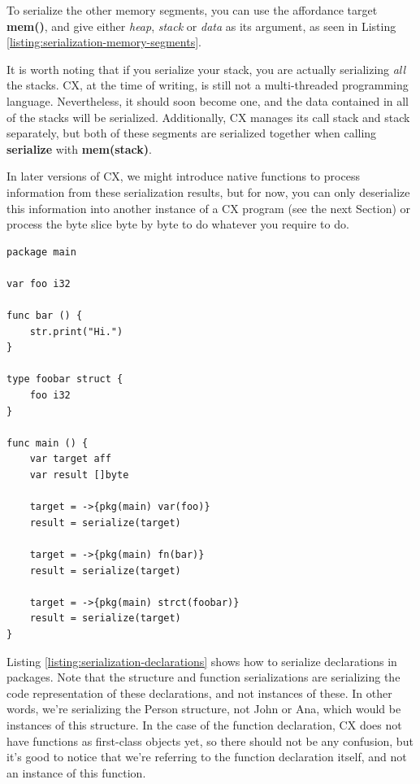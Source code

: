 \documentclass[11pt,fleqn,openany]{book} %
\begin{document}
To serialize the other memory segments, you can use the affordance target \textbf{mem()}, and give either \emph{heap}, \emph{stack} or \emph{data} as its argument, as seen in Listing \ref{listing:serialization-memory-segments}.

It is worth noting that if you serialize your stack, you are actually serializing \emph{all} the stacks. CX, at the time of writing, is still not a multi-threaded programming language. Nevertheless, it should soon become one, and the data contained in all of the stacks will be serialized. Additionally, CX manages its call stack and stack separately, but both of these segments are serialized together when calling \textbf{serialize} with \textbf{mem(stack)}.

In later versions of CX, we might introduce native functions to process information from these serialization results, but for now, you can only deserialize this information into another instance of a CX program (see the next Section) or process the byte slice byte by byte to do whatever you require to do.

\begin{lstlisting}[caption={Serialization of Declarations},captionpos=b,label={listing:serialization-declarations}]
package main

var foo i32

func bar () {
    str.print("Hi.")
}

type foobar struct {
    foo i32
}

func main () {
    var target aff
    var result []byte

    target = ->{pkg(main) var(foo)}
    result = serialize(target)
    
    target = ->{pkg(main) fn(bar)}
    result = serialize(target)
    
    target = ->{pkg(main) strct(foobar)}
    result = serialize(target)
}
\end{lstlisting}

Listing \ref{listing:serialization-declarations} shows how to serialize declarations in packages. Note that the structure and function serializations are serializing the code representation of these declarations, and not instances of these. In other words, we're serializing the Person structure, not John or Ana, which would be instances of this structure. In the case of the function declaration, CX does not have functions as first-class objects yet, so there should not be any confusion, but it's good to notice that we're referring to the function declaration itself, and not an instance of this function.
\end{document}
